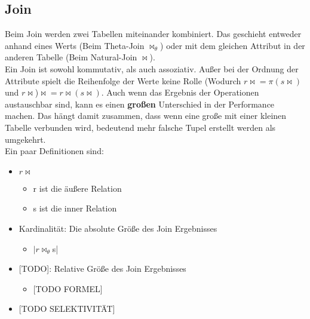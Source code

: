 \documentclass{article}
\begin{document}
	\subsection{Join}
	Beim Join werden zwei Tabellen miteinander kombiniert. Das geschieht entweder anhand eines Werts (Beim Theta-Join $\bowtie_\theta$) oder mit dem gleichen Attribut in der anderen Tabelle (Beim Natural-Join $\bowtie$). \\
	Ein Join ist sowohl kommutativ, als auch assoziativ. Außer bei der Ordnung der Attribute spielt die Reihenfolge der Werte keine Rolle (Wodurch $r\bowtie=\pi(s\bowtie)$ und $r\bowtie$)$\bowtie=r\bowtie(s\bowtie)$. Auch wenn das Ergebnis der Operationen austauschbar sind, kann es einen \textbf{großen} Unterschied in der Performance machen. Das hängt damit zusammen, dass wenn eine große mit einer kleinen Tabelle verbunden wird, bedeutend mehr falsche Tupel erstellt werden als umgekehrt. \\
	Ein paar Definitionen sind:
	\begin{itemize}
		\item{$r\bowtie$}
		\begin{itemize}
			\item{r ist die äußere Relation}
			\item{s ist die inner Relation}
		\end{itemize}
		\item{Kardinalität: Die absolute Größe des Join Ergebnisses}
		\begin{itemize}
			\item{$|r\bowtie_\theta$s|}
		\end{itemize}
		\item{[TODO]: Relative Größe des Join Ergebnisses}
		\begin{itemize}
			\item{[TODO FORMEL]}
		\end{itemize}
		\item{[TODO SELEKTIVITÄT]}
	\end{itemize}
\end{document}

